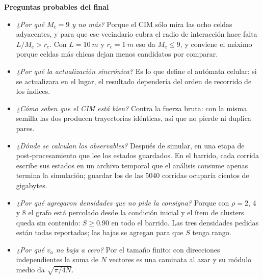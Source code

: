 \documentclass[10pt,a4paper]{article}
\newcommand{\va}{\ensuremath{v_a}}
\newcommand{\Mc}{\ensuremath{M_{\mathrm{c}}}}
\begin{document}
\vspace{0.9em}
\begin{tcolorbox}[colback=grisclaro,colframe=gris!45,boxrule=0.5pt,
                  arc=2pt,left=6pt,right=6pt,top=4pt,bottom=4pt]
{\small\bfseries\color{azul} Preguntas probables del final}\par\vspace{0.3em}
{\small
\begin{itemize}[leftmargin=1.1em,itemsep=0.2em,topsep=0.2em,parsep=0pt]
    \item \emph{¿Por qué $\Mc = 9$ y no más?} Porque el CIM sólo mira las ocho
          celdas adyacentes, y para que ese vecindario cubra el radio de
          interacción hace falta $L/\Mc > r_c$. Con $L = \SI{10}{m}$ y
          $r_c = \SI{1}{m}$ eso da $\Mc \le 9$, y conviene el máximo porque
          celdas más chicas dejan menos candidatos por comparar.
    \item \emph{¿Por qué la actualización sincrónica?} Es lo que define el
          autómata celular: si se actualizara en el lugar, el resultado
          dependería del orden de recorrido de los índices.
    \item \emph{¿Cómo saben que el CIM está bien?} Contra la fuerza bruta: con
          la misma semilla las dos producen trayectorias idénticas, así que no
          pierde ni duplica pares.
    \item \emph{¿Dónde se calculan los observables?} Después de simular, en una
          etapa de post-procesamiento que lee los estados guardados. En el
          barrido, cada corrida escribe sus estados en un archivo temporal que
          el análisis consume apenas termina la simulación; guardar los de las
          \num{5040} corridas ocuparía cientos de gigabytes.
    \item \emph{¿Por qué agregaron densidades que no pide la consigna?} Porque
          con $\rho = 2$, \num{4} y \num{8} el grafo está percolado desde la
          condición inicial y el ítem de clusters queda sin contenido: $S \ge
          0.90$ en todo el barrido. Las tres densidades pedidas están todas
          reportadas; las bajas se agregan para que $S$ tenga rango.
    \item \emph{¿Por qué \va{} no baja a cero?} Por el tamaño finito: con
          direcciones independientes la suma de $N$ vectores es una caminata al
          azar y su módulo medio da $\sqrt{\pi/4N}$.
\end{itemize}}
\end{tcolorbox}
\end{document}
